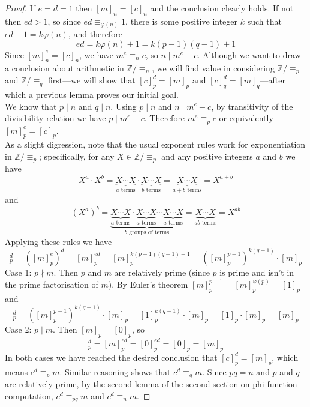 \documentclass{report}
\theoremstyle{definition}
\begin{document}
\begin{proof}
If $e=d=1$ then $[m]_n=[c]_n$ and the conclusion clearly holds. If not then $ed>1$, so since $ed\equiv_{\varphi(n)}1$, there is some 
positive integer $k$ such that $ed-1=k\varphi(n)$, and therefore
\begin{equation*}
ed=k\varphi(n)+1=k(p-1)(q-1)+1
\end{equation*}
Since $[m]^e_n=[c]_n$, we have $m^e\equiv_n c$, so $n\mid m^e-c$.
Although we want to draw a conclusion about arithmetic in $\mathbb Z/\equiv_n$, we will find value in considering 
$\mathbb Z/\equiv_p$ and $\mathbb Z/\equiv_q$ first---we will show that $[c]^d_p=[m]_p$ and $[c]^d_q=[m]_q$---after which a previous
lemma proves our initial goal.\\
\indent We know that $p\mid n$ and $q\mid n$. Using $p\mid n$ and $n\mid m^e-c$, by transitivity of the divisibility relation we have 
$p\mid m^e-c$. Therefore $m^e\equiv_pc$ or equivalently $[m]^e_p=[c]_p$.\\
\indent As a slight digression, note that the usual exponent rules work for exponentiation in $\mathbb Z/\equiv_p$; specifically, for
any $X\in\mathbb Z/\equiv_p$ and any positive integers $a$ and $b$ we have
\begin{equation*}
X^a\cdot X^b=\underbrace{X\cdots X}_{a\text{ terms}}\cdot\underbrace{X\cdots X}_{b\text{ terms}}
=\underbrace{X\cdots X}_{a+b\text{ terms}}=X^{a+b}
\end{equation*}
and
\begin{equation*}
(X^a)^b=\underbrace{\underbrace{X\cdots X}_{a\text{ terms}}\cdot\underbrace{X\cdots X}_{a\text{ terms}}\cdots
\underbrace{X\cdots X}_{a\text{ terms}}}_{b\text{ groups of terms}}
=\underbrace{X\cdots X}_{ab\text{ terms}}=X^{ab}
\end{equation*}
Applying these rules we have
\begin{equation*}
[c]^d_p=([m]^e_p)^d=[m]^{ed}_p=[m]^{k(p-1)(q-1)+1}_p=([m]_p^{p-1})^{k(q-1)}\cdot[m]_p
\end{equation*}
\indent Case 1: $p\nmid m$. Then $p$ and $m$ are relatively prime (since $p$ is prime and isn't in the prime factorisation of $m$). By Euler's theorem 
$[m]^{p-1}_p=[m]^{\varphi(p)}_p=[1]_p$ and
\begin{equation*}
[c]^d_p=([m]_p^{p-1})^{k(q-1)}\cdot[m]_p=[1]^{k(q-1)}_p\cdot[m]_p
=[1]_p\cdot[m]_p=[m]_p
\end{equation*}
\indent Case 2: $p\mid m$. Then $[m]_p=[0]_p$, so 
\begin{equation*}
[c]^d_p=[m]^{ed}_p=[0]^{ed}_p=[0]_p=[m]_p
\end{equation*}
In both cases we have reached the desired conclusion that $[c]^d_p=[m]_p$, which means $c^d\equiv_pm$. Similar reasoning shows that 
$c^d\equiv_qm$. Since $pq=n$ and $p$ and $q$ are relatively prime, by the second lemma of the second section on phi function 
computation, $c^d\equiv_{pq}m$ and $c^d\equiv_nm$.
\end{proof}
\newpage
\end{document}

